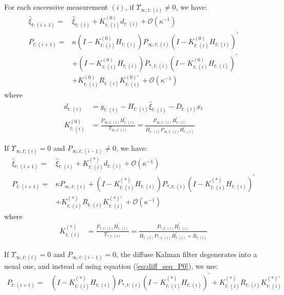 \documentclass[10pt]{article}
\numberwithin{equation}{section}
\begin{document}
For each successive measurement $(i)$, if $\Upsilon_{\infty,t:(i)}\neq0$, we have:
\begin{align}
    \hat{\xi}_{t:(i+1)} = & \hat{\xi}_{t:(i)} + K_{t:(i)}^{(0)}d_{t:(i)} + \mathcal{O}(\kappa^{-1}) \label{eq:diff_seq_xi1} \\
    P_{t:(i+1)} =& \kappa(I-K_{t:(i)}^{(0)}H_{t:(i)})P_{\infty,t:(i)}(I-K_{t:(i)}^{(0)}H_{t:(i)})^{'} \label{eq:diff_seq_P1} \\
        & + (I-K_{t:(i)}^{(0)}H_{t:(i)})P_{*,t:(i)}(I-K_{t:(i)}^{(0)}H_{t:(i)})^{'} \nonumber \\
        & + K_{t:(i)}^{(0)}R_{t:(i)}K_{t:(i)}^{(0)'} + \mathcal{O}(\kappa^{-1}) \nonumber
\end{align}
where
\begin{align*}
    d_{t:(i)} &= y_{t:(i)} - H_{t:(i)}\hat{\xi}_{t:(i)}-D_{t:(i)}x_t \\
    K_{t:(i)}^{(0)} &= \frac{P_{\infty,t:(i)}H_{t:(i)}^{'}}{\Upsilon_{\infty,t:(i)}} 
        =\frac{P_{\infty,t:(i)}H_{t:(i)}^{'}}{H_{t:(i)}P_{\infty, t:(i)}H_{t:(i)}^{'}}
\end{align*}

If $\Upsilon_{\infty,t:(i)}=0$ and $P_{\infty,t:(i-1)}\neq 0$, we have:
\begin{align}
    \hat{\xi}_{t:(i+1)} =& \hat{\xi}_{t:(i)} + K_{t:(i)}^{(*)}d_{t:(i)} + \mathcal{O}(\kappa^{-1}) \label{eq:diff_seq_xi0} \\
    P_{t:(i+1)} =& \kappa P_{\infty,t:(i)} + (I-K_{t:(i)}^{(*)}H_{t:(i)})P_{*,t:(i)}(I-K_{t:(i)}^{(*)}H_{t:(i)})^{'} \label{eq:diff_seq_P0} \\
        &+ K_{t:(i)}^{(*)}R_{t:(i)}K_{t:(i)}^{(*)'} + \mathcal{O}(\kappa^{-1}) \nonumber 
\end{align}
where
\begin{align*}
    K_{t:(i)}^{(*)} &= \frac{P_{*,t:(i)}H_{t:(i)}^{'}}{\Upsilon_{*,t:(i)}} = \frac{P_{*,t:(i)}H_{t:(i)}^{'}}{H_{t:(i)}P_{*,t:(i)}H_{t:(i)}^{'} + R_{t:(i)}}
\end{align*}

If $\Upsilon_{\infty,t:(i)}=0$ and $P_{\infty,t:(i-1)}=0$, the diffuse Kalman filter degenerates into a usual one, and instead of using equation (\ref{eq:diff_seq_P0}), we use:
\begin{align}
    P_{t:(i+1)} =& (I-K_{t:(i)}^{(*)}H_{t:(i)})P_{*,t:(i)}(I-K_{t:(i)}^{(*)}H_{t:(i)})^{'} + K_{t:(i)}^{(*)}R_{t:(i)}K_{t:(i)}^{(*)'} \label{eq:usual_seq_P0} 
\end{align}
\end{document}
